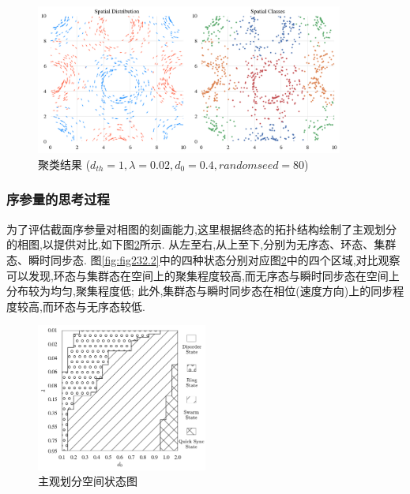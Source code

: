 \documentclass{article}
\begin{document}
\begin{figure}[H]
	\centering
	\includegraphics[width=0.9\textwidth]{./figs/ClusteringResult.png}
	\vspace{-0.4cm}
	\caption{聚类结果 ($d_{th}=1, \lambda=0.02, d_0=0.4, random seed=80$)}
	\label{fig:fig233.1}
\end{figure}

\subsubsection{序参量的思考过程}

为了评估截面序参量对相图的刻画能力,这里根据终态的拓扑结构绘制了主观划分的相图,以提供对比,如下图\ref{fig:fig234.1}所示. 从左至右,从上至下,分别为无序态、环态、集群态、瞬时同步态. 图\ref{fig:fig232.2}中的四种状态分别对应图\ref{fig:fig234.1}中的四个区域,对比观察可以发现,环态与集群态在空间上的聚集程度较高,而无序态与瞬时同步态在空间上分布较为均匀,聚集程度低; 此外,集群态与瞬时同步态在相位(速度方向)上的同步程度较高,而环态与无序态较低.

\begin{figure}[H]
	\centering
	\includegraphics[width=0.5\textwidth]{./figs/subjectiveOp3.png}
	\vspace{-0.5cm}
	\caption{主观划分空间状态图}
	\label{fig:fig234.1}
\end{figure}
\vspace{-0.5cm}
\end{document}
